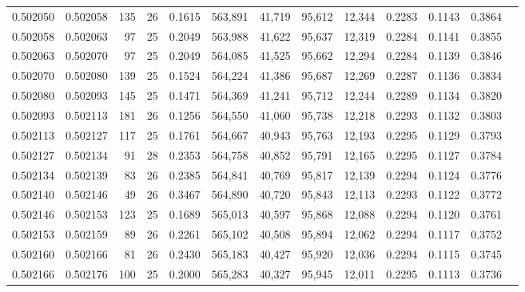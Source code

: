 \begin{tabular}{rrrrrrrrrrrrr}
0.502050 & 0.502058 & 135 &  26 &                                     0.1615 & 563,891 &  41,719 &  95,612 &  12,344 & 0.2283 & 0.1143 & 0.3864 \\
0.502058 & 0.502063 &  97 &  25 &                                     0.2049 & 563,988 &  41,622 &  95,637 &  12,319 & 0.2284 & 0.1141 & 0.3855 \\
0.502063 & 0.502070 &  97 &  25 &                                     0.2049 & 564,085 &  41,525 &  95,662 &  12,294 & 0.2284 & 0.1139 & 0.3846 \\
0.502070 & 0.502080 & 139 &  25 &                                     0.1524 & 564,224 &  41,386 &  95,687 &  12,269 & 0.2287 & 0.1136 & 0.3834 \\
0.502080 & 0.502093 & 145 &  25 &                                     0.1471 & 564,369 &  41,241 &  95,712 &  12,244 & 0.2289 & 0.1134 & 0.3820 \\
0.502093 & 0.502113 & 181 &  26 &                                     0.1256 & 564,550 &  41,060 &  95,738 &  12,218 & 0.2293 & 0.1132 & 0.3803 \\
0.502113 & 0.502127 & 117 &  25 &                                     0.1761 & 564,667 &  40,943 &  95,763 &  12,193 & 0.2295 & 0.1129 & 0.3793 \\
0.502127 & 0.502134 &  91 &  28 &                                     0.2353 & 564,758 &  40,852 &  95,791 &  12,165 & 0.2295 & 0.1127 & 0.3784 \\
0.502134 & 0.502139 &  83 &  26 &                                     0.2385 & 564,841 &  40,769 &  95,817 &  12,139 & 0.2294 & 0.1124 & 0.3776 \\
0.502140 & 0.502146 &  49 &  26 &                                     0.3467 & 564,890 &  40,720 &  95,843 &  12,113 & 0.2293 & 0.1122 & 0.3772 \\
0.502146 & 0.502153 & 123 &  25 &                                     0.1689 & 565,013 &  40,597 &  95,868 &  12,088 & 0.2294 & 0.1120 & 0.3761 \\
0.502153 & 0.502159 &  89 &  26 &                                     0.2261 & 565,102 &  40,508 &  95,894 &  12,062 & 0.2294 & 0.1117 & 0.3752 \\
0.502160 & 0.502166 &  81 &  26 &                                     0.2430 & 565,183 &  40,427 &  95,920 &  12,036 & 0.2294 & 0.1115 & 0.3745 \\
0.502166 & 0.502176 & 100 &  25 &                                     0.2000 & 565,283 &  40,327 &  95,945 &  12,011 & 0.2295 & 0.1113 & 0.3736 \\

\end{tabular}
